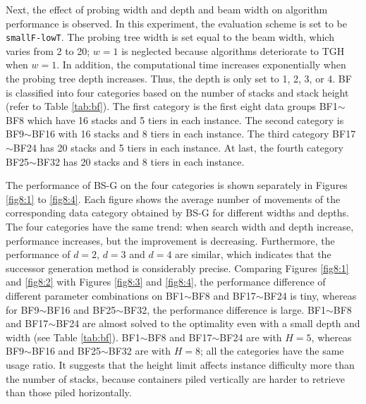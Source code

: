 \documentclass[review,3p,times,authoryear,12pt]{elsarticle}
\begin{document}
Next, the effect of probing width and depth and beam width on algorithm performance is observed. In this experiment, the evaluation scheme is set to be \texttt{smallF-lowT}. The probing tree width is set equal to the beam width, which varies from 2 to 20; $w=1$ is neglected because algorithms deteriorate to TGH when $w=1$. In addition, the computational time increases exponentially when the probing tree depth increases. Thus, the depth is only set to 1, 2, 3, or 4. BF is classified into four categories based on the number of stacks and stack height (refer to Table \ref{tab:bf}). The first category is the first eight data groups BF1$\sim$BF8 which have 16 stacks and 5 tiers in each instance. The second category is BF9$\sim$BF16 with 16 stacks and 8 tiers in each instance. The third category BF17$\sim$BF24 has 20 stacks and 5 tiers in each instance. At last, the fourth category BF25$\sim$BF32 has 20 stacks and 8 tiers in each instance.

The performance of BS-G on the four categories is shown separately in Figures \ref{fig8:1} to \ref{fig8:4}. Each figure shows the average number of movements of the corresponding data category obtained by BS-G for different widths and depths. The four categories have the same trend: when search width and depth increase, performance increases, but the improvement is decreasing. Furthermore, the performance of $d=2$, $d=3$ and $d=4$ are similar, which indicates that the successor generation method is considerably precise. Comparing Figures \ref{fig8:1} and \ref{fig8:2} with Figures \ref{fig8:3} and \ref{fig8:4}, the performance difference of different parameter combinations on BF1$\sim$BF8 and BF17$\sim$BF24 is tiny, whereas for BF9$\sim$BF16 and BF25$\sim$BF32, the performance difference is large. BF1$\sim$BF8 and BF17$\sim$BF24 are almost solved to the optimality even with a small depth and width (see Table \ref{tab:bf}). BF1$\sim$BF8 and BF17$\sim$BF24 are with $H=5$, whereas BF9$\sim$BF16 and BF25$\sim$BF32 are with $H=8$; all the categories have the same usage ratio. It suggests that the height limit affects instance difficulty more than the number of stacks, because containers piled vertically are harder to retrieve than those piled horizontally. %
\end{document}
